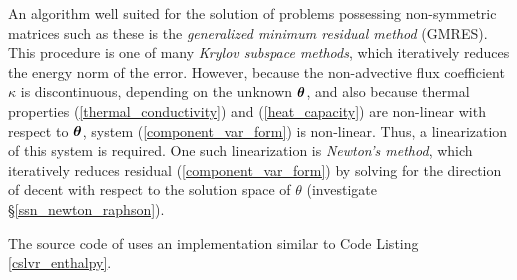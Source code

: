 An algorithm well suited for the solution of problems possessing non-symmetric matrices such as these is the \emph{generalized minimum residual method} (GMRES).  This procedure is one of many \emph{Krylov subspace methods}, which iteratively reduces the energy norm of the error.  However, because the non-advective flux coefficient $\kappa$ is discontinuous, depending on the unknown $\bm{\theta}$, and also because thermal properties (\ref{thermal_conductivity}) and (\ref{heat_capacity}) are non-linear with respect to $\bm{\theta}$, system (\ref{component_var_form}) is non-linear.  Thus, a linearization of this system is required.  One such linearization is \emph{Newton's method}, which iteratively reduces residual (\ref{component_var_form}) by solving for the direction of decent with respect to the solution space of $\theta$ (investigate \S \ref{ssn_newton_raphson}).

The source code of \CSLVR uses an implementation similar to Code Listing \ref{cslvr_enthalpy}.

